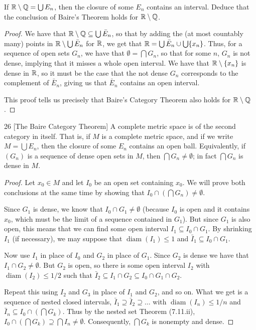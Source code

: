 \begin{exercise}{25}
If $\mathbb{R} \setminus \mathbb{Q} = \bigcup E_n$, then the closure of some $E_n$ contains an interval.
Deduce that the conclusion of Baire's Theorem holds for $\mathbb{R} \setminus \mathbb{Q}$.
\end{exercise}
\begin{proof}
We have that $\mathbb{R} \setminus \mathbb{Q} \subseteq \bigcup \bar{E}_n$, so that by adding the (at most countably many) points in $\mathbb{R} \setminus \bigcup \bar{E}_n$ for $\mathbb{R}$, we get that $\mathbb{R} = \bigcup \bar{E}_n \cup \bigcup \{x_n\}$.
Thus, for a sequence of open sets $G_n$, we have that $\emptyset = \bigcap G_n$, so that for some $n$, $G_n$ is not dense, implying that it misses a whole open interval.
We have that $\mathbb{R} \setminus \{x_n\}$ is dense in $\mathbb{R}$, so it must be the case that the not dense $G_n$ corresponds to the complement of $\bar{E}_n$, giving us that $\bar{E}_n$ contains an open interval.

This proof tells us precisely that Baire's Category Theorem also holds for $\mathbb{R} \setminus \mathbb{Q}$.
\end{proof} 

\begin{exercise}{26 [The Baire Category Theorem]}
A complete metric space is of the second category in itself.
That is, if $M$ is a complete metric space, and if we write $M = \bigcup E_n$, then the closure of some $E_n$ contains an open ball.
Equivalently, if $(G_n)$ is a sequence of dense open sets in $M$, then $\bigcap G_n \neq \emptyset$;
in fact $\bigcap G_n$ is dense in $M$.
\end{exercise}
\begin{proof}
Let $x_0 \in M$ and let $I_0$ be an open set containing $x_0$.
We will prove both conclusions at the same time by showing that $I_0 \cap (\bigcap G_n) \neq \emptyset$.

Since $G_1$ is dense, we know that $I_0 \cap G_1 \neq \emptyset$ (because $I_0$ is open and it contains $x_0$, which must be the limit of a sequence contained in $G_1$).
But since $G_1$ is also open, this means that we can find some open interval $I_1 \subseteq I_0 \cap G_1$.
By shrinking $I_1$ (if necessary), we may suppose that $\operatorname{diam}(I_1) \leq 1$ and $\bar{I}_1 \subseteq I_0 \cap G_1$.

Now use $I_1$ in place of $I_0$ and $G_2$ in place of $G_1$.
Since $G_2$ is dense we have that $I_1 \cap G_2 \neq \emptyset$.
But $G_2$ is open, so there is some open interval $I_2$ with $\operatorname{diam}(I_2) \leq 1/2$ such that $\bar{I}_2 \subseteq I_1 \cap G_2 \subseteq I_0 \cap G_1 \cap G_2$.

Repeat this using $I_2$ and $G_3$ in place of $I_1$ and $G_2$, and so on.
What we get is a sequence of nested closed intervals, $\bar{I}_1 \supseteq \bar{I}_2 \supseteq \dots$ with $\operatorname{diam}(I_n) \leq 1/n$ and $\bar{I}_n \subseteq I_0 \cap (\bigcap G_k)$.
Thus by the nested set Theorem (7.11.ii), $I_0 \cap (\bigcap G_k) \supseteq \bigcap I_n \neq \emptyset$. 
Consequently, $\bigcap G_k$ is nonempty and dense.
\end{proof} 


